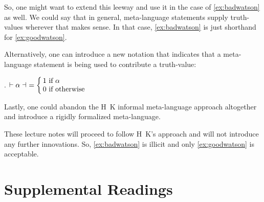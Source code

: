 So, %
%
one might want to extend this leeway and use it in the case of
\ref{ex:badwatson} as well. We could say that in general, meta-language
statements supply truth-values wherever that makes sense. In that case,
\ref{ex:badwatson} is just shorthand for \ref{ex:goodwatson}.

\newcommand{\nupsis}[1]{\ensuremath{\vdash #1 \dashv}}

Alternatively, %
%
one can introduce a new notation that indicates that a meta-language statement
is being used to contribute a truth-value:

\ex. $\nupsis{\alpha}\ = \leftchoice{1 if $\alpha$,0 if otherwise}$

Lastly, one could abandon the H\amp\ K informal meta-language approach
altogether and introduce a rigidly formalized meta-language.

These lecture notes will proceed to follow H\amp\ K's approach and will not
introduce any further innovations. So, \ref{ex:badwatson} is illicit and only
\ref{ex:goodwatson} is acceptable.
\section{Supplemental Readings}


